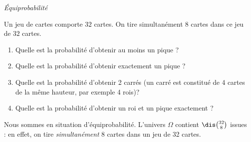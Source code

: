 \documentclass[a4paper,10pt]{report}
\begin{document}
\begin{center}
\textit{{ {\large Équiprobabilité}}}
\end{center}

\medskip



\begin{Exercice}{} Un jeu de cartes comporte $32$ cartes. On tire simultanément $8$ cartes dans ce jeu de $32$ cartes. 

\begin{enumerate}
\item Quelle est la probabilité d'obtenir au moins un pique ?
\item Quelle est la probabilité d'obtenir exactement un pique ?
\item Quelle est la probabilité d'obtenir 2 carrés (un carré est constitué de 4 cartes de la même hauteur, par exemple 4 rois)?
\item Quelle est la probabilité d'obtenir un roi et un pique exactement ?
\end{enumerate}
\end{Exercice} 

\corr Nous sommes en situation d'équiprobabilité. L'univers $\Omega$ contient $\dis \binom{32}{8}$ issues : en effet, on tire \textit{simultanément} 8 cartes dans un jeu de 32 cartes.
\end{document}
